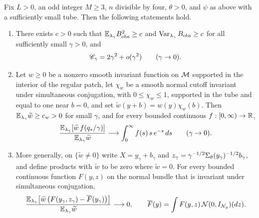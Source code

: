 \begin{theorem}\label{s2:thm:regular}
Fix $L>0$, an odd integer $M\ge3$, $n$ divisible by four, $\theta>0$, and $\psi$ as above with a sufficiently small tube. Then the following statements hold.
\begin{enumerate}
\item There exists $c>0$ such that $\mathbb E_{\lambda_\gamma}B_{\mathrm{obs}}^2\ge c$ and $\operatorname{Var}_{\lambda_\gamma}B_{\mathrm{obs}}\ge c$ for all sufficiently small $\gamma>0$, and
\[
 \mathscr C_\gamma=2\gamma^2+o(\gamma^2)\qquad(\gamma\to0).
\]
\item Let $w\ge0$ be a nonzero smooth invariant function on $\mathcal M$ supported in the interior of the regular patch, let $\chi_w$ be a smooth normal cutoff invariant under simultaneous conjugation, with $0\le\chi_w\le1$, supported in the tube and equal to one near $b=0$, and set $\widetilde w(y+b)=w(y)\chi_w(b)$. Then $\mathbb E_{\lambda_\gamma}\widetilde w\ge c_w>0$ for small $\gamma$, and for every bounded continuous $f:[0,\infty)\to\mathbb R$,
\[
 \frac{\mathbb E_{\lambda_\gamma}[\widetilde w\,f(q_*/\gamma)]}{\mathbb E_{\lambda_\gamma}\widetilde w}\longrightarrow\int_0^\infty f(s)\,s\,e^{-s}\,ds\qquad(\gamma\to0).
\]
\item More generally, on $\{\widetilde w\ne0\}$ write $X=y_\gamma+b_\gamma$ and $z_\gamma=\gamma^{-1/2}\Sigma_\theta(y_\gamma)^{-1/2}b_\gamma$, and define products with $\widetilde w$ to be zero where $\widetilde w=0$. For every bounded continuous function $F(y,z)$ on the normal bundle that is invariant under simultaneous conjugation,
\[
 \frac{\mathbb E_{\lambda_\gamma}\bigl[\widetilde w\,\bigl(F(y_\gamma,z_\gamma)-\overline F(y_\gamma)\bigr)\bigr]}{\mathbb E_{\lambda_\gamma}\widetilde w}\longrightarrow0,\qquad
 \overline F(y)=\int F(y,z)\,\mathcal N(0,I_{\mathcal N_{y}})(dz).
\]
\end{enumerate}
\end{theorem}

